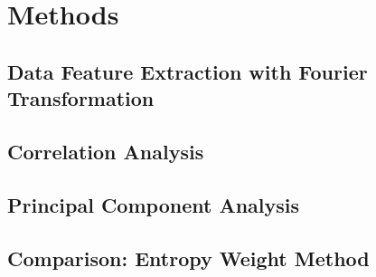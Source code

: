 \section{Methods}
% 
% 
\subsection{Data Feature Extraction with Fourier Transformation}
\subsection{Correlation Analysis}
\subsection{Principal Component Analysis}
\subsection{Comparison: Entropy Weight Method}